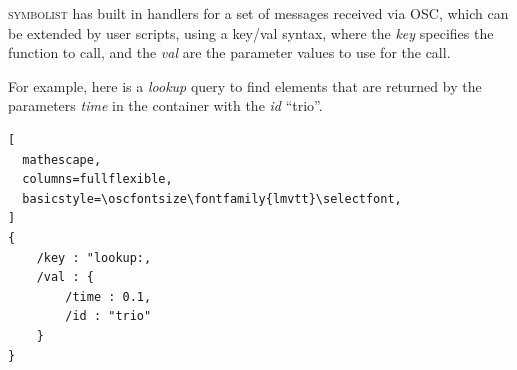 \documentclass{article}
\def\symbolist{\textsc{symbolist}\xspace}
\def\oscfontsize{\footnotesize}
\begin{document}
\symbolist has built in handlers for a set of messages received via OSC, which can be extended by user scripts, using a key/val syntax, where the \textit{key} specifies the function to call, and the \textit{val} are the parameter values to use for the call.

For example, here is a \textit{lookup} query to find elements that are returned by the parameters \textit{time} in the container with the \textit{id} ``trio''.


\begin{lstlisting}[
  mathescape,
  columns=fullflexible,
  basicstyle=\oscfontsize\fontfamily{lmvtt}\selectfont,
]
{
    /key : "lookup:,
    /val : {
        /time : 0.1,
        /id : "trio"
    }
}

\end{lstlisting}
\end{document}

